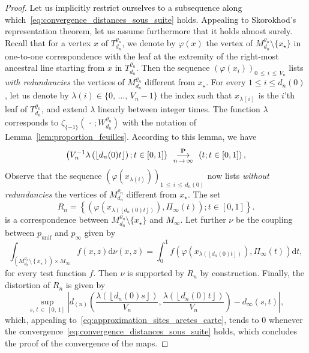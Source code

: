 \documentclass[AHL,Unicode,longabstracts,published]{cedram}
\newcommand{\ensembles}[1]{\mathbf{#1}}
\renewcommand{\P}{\ensembles{P}}
\newcommand{\1}{\ensembles{1}}
\renewcommand{\le}{\leqslant}
\newcommand{\Rmap}{R}
\renewcommand{\d}{\mathrm{d}}
\newcommand{\mn}{M_{d_n}^{\varrho_n}}
\newcommand{\pgr}{p_{\mathrm{unif}}}
\newcommand{\fn}{T_{d_n}^{\varrho_n}}
\newcommand{\Wfn}{W_{d_n}^{\varrho_n}}
\newcommand{\vertices}{V}
\newcommand{\cvproba}[1][n]{\enskip\mathop{\longrightarrow}^{\P}_{#1\,\to\, \infty}\enskip}
\begin{document}
\begin{proof}
Let us implicitly restrict ourselves to a subsequence along which~\eqref{eq:convergence_distances_sous_suite} holds. Appealing to Skorokhod's representation theorem, let us assume furthermore that it holds almost surely. Recall that for a vertex $x$ of $\fn$, we denote by $\varphi(x)$ the vertex of $\mn\setminus\{x_\star\}$ in one-to-one correspondence with the leaf at the extremity of the right-most ancestral line starting from $x$ in $\fn$. Then the sequence $(\varphi(x_i))_{0\,\le\,i\,\le\, \vertices_n}$ lists \emph{with redundancies} the vertices of $\mn$ different from $x_\star$. For every $1 \le i \le d_n(0)$, let us denote by $\lambda(i) \in \{0, \,\dots,\,\vertices_n-1\}$ the index such that $x_{\lambda(i)}$ is the $i$'th leaf of $\fn$, and extend $\lambda$ linearly between integer times. The function $\lambda$ corresponds to $\zeta_{\{-1\}}(\,\cdot\,; \Wfn)$ with the notation of Lemma~\ref{lem:proportion_feuilles}. According to this lemma, we have
\begin{equation}\label{eq:approximation_sites_aretes_carte}
\left(\vertices_n^{-1} \lambda\left(\left\lfloor d_n(0) t\right\rfloor\right) ; t \in [0,1]\right) \cvproba \left(t ; t \in [0,1]\right),
\end{equation}
Observe that the sequence $(\varphi(x_{\lambda(i)}))_{1\,\le\,i\,\le\,d_n(0)}$ now lists \emph{without redundancies} the vertices of $\mn$ different from $x_\star$. The set
\[
\Rmap_n = \left\{\left(\varphi\left(x_{\lambda\left(\left\lfloor d_n(0) t\right\rfloor\right)}\right), \Pi_\infty(t)\right) ; t \in [0,1]\right\}.
\]
is a correspondence between $\mn\setminus\{x_\star\}$ and $M_\infty$. Let further $\nu$ be the coupling between $\pgr$ and $p_\infty$ given by
\[
\int_{\left(\mn\setminus\left\{x_\star\right\}\right) \times M_\infty} f(x, z) \d\nu(x, z) = \int_0^1 f\left(\varphi\left(x_{\lambda\left(\left\lfloor d_n(0) t\right\rfloor\right)}\right), \Pi_\infty(t)\right) \d t,
\]
for every test function $f$. Then $\nu$ is supported by $\Rmap_n$ by construction. Finally, the distortion of $\Rmap_n$ is given by
\[
\sup_{s,\,t\,\in\,[0,\,1]} \left|d_{(n)}\left(\frac{\lambda\left(\left\lfloor d_n(0) s\right\rfloor\right)}{\vertices_n}, \frac{\lambda\left(\left\lfloor d_n(0) t\right\rfloor\right)}{\vertices_n}\right) - d_\infty(s,t)\right|,
\]
which, appealing to~\eqref{eq:approximation_sites_aretes_carte}, tends to $0$ whenever the convergence~\eqref{eq:convergence_distances_sous_suite} holds, which concludes the proof of the convergence of the maps.


\end{proof}
\end{document}
